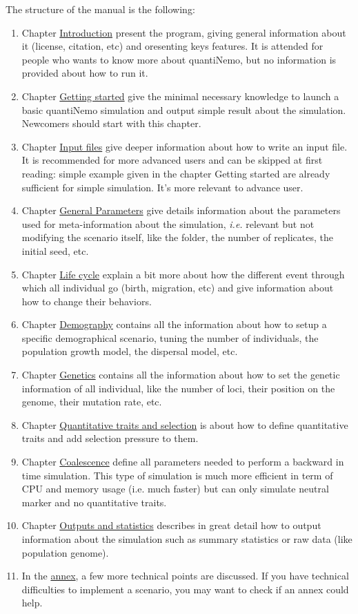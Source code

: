 \documentclass[letterpaper,12pt,oneside]{book}
\begin{document}
The structure of the manual is the following:
\begin{enumerate}
\item Chapter \hyperref[chap:Introduction]{Introduction} present the program, giving general information about it (license, citation, etc) and oresenting keys features. It is attended for people who wants to know more about quantiNemo, but no information is provided about how to run it. 
\item Chapter \hyperref[chap:GettingStarted] {Getting started} give the minimal necessary knowledge to launch a basic quantiNemo simulation and output simple result about the simulation. Newcomers should start with this chapter. 
\item Chapter \hyperref[chap:InputFiles]{Input files} give deeper information about how to write an input file. It is recommended for more advanced users and can be skipped at first reading: simple example given in the chapter Getting started are already sufficient for simple simulation. It's more relevant to advance user. 
\item Chapter \hyperref[chap:GeneralParameters]{General Parameters} give details information about the parameters used for meta-information about the simulation, \textit{i.e.} relevant but not modifying the scenario itself, like the folder, the number of replicates, the initial seed, etc. 
\item Chapter \hyperref[chap:LifeCycle]{Life cycle} explain a bit more about how the different event through which all individual go (birth, migration, etc) and give information about how to change their behaviors. 
\item Chapter \hyperref[chap:Demography]{Demography} contains all the information about how to setup a specific demographical scenario, tuning the number of individuals, the population growth model, the dispersal model, etc. 
\item Chapter \hyperref[chap:Genetics]{Genetics} contains all the information about how to set the genetic information of all individual, like the number of loci, their position on the genome, their mutation rate, etc. 
\item Chapter \hyperref[chap:QuantitativeTraitsAndSelection]{Quantitative traits and selection} is about how to define quantitative traits and add selection pressure to them. 
\item Chapter \hyperref[chap:Coalescence]{Coalescence} define all parameters needed to perform a backward in time simulation. This type of simulation is much more efficient in term of CPU and memory usage (i.e. much faster) but can only simulate neutral marker and no quantitative traits.
\item Chapter \hyperref[chap:OutputsAndStatistics]{Outputs and statistics} describes in great detail how to output information about the simulation such as summary statistics or raw data (like population genome).  
\item In the \hyperref[chap:TechnicalDetails]{annex}, a few more technical points are discussed. If you have technical difficulties to implement a scenario, you may want to check if  an annex could help. 
\end{enumerate}
\end{document}
